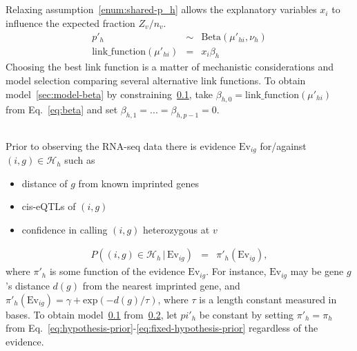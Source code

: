 \documentclass[letterpaper]{article}
\begin{document}
\subsection{}
\label{sec:model-regression}

Relaxing assumption~\ref{enum:shared-p_h} allows the explanatory
variables \(x_i\) to influence the expected fraction \(Z_v/n_v\).
\begin{eqnarray}
p'_h &\sim& \mathrm{Beta}(\mu'_{hi}, \nu_h) \\
\mathrm{link\_function}(\mu'_{hi}) &=& x_i \beta_h
\end{eqnarray}
Choosing the best link function is a matter of mechanistic considerations and
model selection comparing several alternative link functions.  To obtain
model~\ref{sec:model-beta} by constraining~\ref{sec:model-regression}, take
\(\beta_{h,0}=\mathrm{link\_function}(\mu'_{hi})\) from Eq.~\ref{eq:beta} and
set \(\beta_{h,1}=...=\beta_{h,p-1}=0\).

\subsection{}
\label{sec:model-prior-evidence}

Prior to observing the RNA-seq data there is evidence \(\mathrm{Ev}_{ig}\)
for/against \((i,g)\in \mathcal{H}_h\) such as
\begin{itemize}
\item distance of \(g\) from known imprinted genes
\item cis-eQTLs of \((i,g)\)
\item confidence in calling \((i,g)\) heterozygous at \(v\)
\end{itemize}

\begin{eqnarray}
P\left( (i,g) \in \mathcal{H}_h\, |\, \mathrm{Ev}_{ig} \right) &=&
\pi'_h(\mathrm{Ev}_{ig}),
\end{eqnarray}
where \(\pi'_h\) is some function of the evidence \(\mathrm{Ev}_{ig}\).  For
instance, \(\mathrm{Ev}_{ig}\) may be gene \(g\)'s distance \(d(g)\) from the
nearest imprinted gene, and \(\pi'_h(\mathrm{Ev}_{ig}) = \gamma +
\mathrm{exp}(- d(g) / \tau) \), where \(\tau\) is a length constant measured
in bases.  To obtain model~\ref{sec:model-regression}
from~\ref{sec:model-prior-evidence}, let \(pi'_h\) be
constant  by setting \(\pi'_h = \pi_h\) from
Eq.~\ref{eq:hypothesis-prior}-\ref{eq:fixed-hypothesis-prior} regardless of
the evidence.
\end{document}
